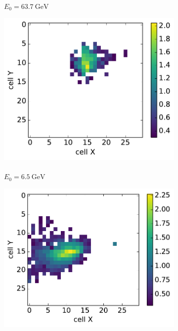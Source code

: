 \begin{figure}
\begin{subfigure}{0.24\textwidth}
    \caption{\\$E_0 = 63.7~\text{GeV}$ }%
  \end{subfigure}
  \begin{subfigure}{0.24\textwidth}
    \centering
    \includegraphics[width=1\textwidth]{figures/2_gen.pdf}
    \caption{\\$E_0 = 6.5~\text{GeV}$ }%
  \end{subfigure}
    \begin{subfigure}{0.24\textwidth}
    \centering
    \includegraphics[width=1\textwidth]{figures/3_gen.pdf}

\end{subfigure}
\end{figure}
